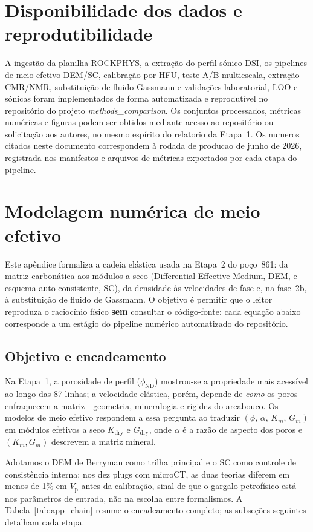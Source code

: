 \documentclass[11pt,a4paper]{article}
\numberwithin{equation}{section}
\newcommand{\phiND}{\ensuremath{\phi_{\mathrm{ND}}}}
\newcommand{\Vp}{\ensuremath{V_{\mathrm{p}}}}
\begin{document}
\section*{Disponibilidade dos dados e reprodutibilidade}

A ingestão da planilha ROCKPHYS, a extração do perfil sónico DSI, os
pipelines de meio efetivo DEM/SC, calibração por HFU, teste A/B multiescala,
extração CMR/NMR, substituição de fluido Gassmann e validações laboratorial,
LOO e sónicas foram
implementados de forma automatizada e reprodutível no repositório do projeto
\emph{methods\_comparison}.
Os conjuntos processados, métricas numéricas e figuras podem ser obtidos
mediante acesso ao repositório ou solicitação aos autores, no mesmo
espírito do relatorio da Etapa~1.
Os numeros citados neste documento correspondem à rodada de producao de
junho de 2026, registrada nos manifestos e arquivos de métricas exportados
por cada etapa do pipeline.

\appendix

\section{Modelagem numérica de meio efetivo}
\label{app:dem_core}

Este apêndice formaliza a cadeia elástica usada na Etapa~2 do poço~861:
da matriz carbonática aos módulos a seco (Differential Effective Medium, DEM,
e esquema auto-consistente, SC), da densidade às velocidades de fase e,
na fase~2b, à substituição de fluido de Gassmann.
O objetivo é permitir que o leitor reproduza o raciocínio físico \textbf{sem}
consultar o código-fonte: cada equação abaixo corresponde a um estágio do
pipeline numérico automatizado do repositório.

\subsection{Objetivo e encadeamento}

Na Etapa~1, a porosidade de perfil (\phiND{}) mostrou-se a propriedade mais
acessível ao longo das 87 linhas; a velocidade elástica, porém, depende de
\emph{como} os poros enfraquecem a matriz---geometria, mineralogia e rigidez
do arcabouco.
Os modelos de meio efetivo respondem a essa pergunta ao traduzir
$(\phi,\,\alpha,\,K_m,\,G_m)$ em módulos efetivos a seco
$K_{\mathrm{dry}}$ e $G_{\mathrm{dry}}$, onde $\alpha$ é a razão de aspecto
dos poros e $(K_m,G_m)$ descrevem a matriz mineral.

Adotamos o DEM de Berryman como trilha principal e o SC como controle de
consistência interna: nos dez plugs com microCT, as duas teorias diferem em
menos de 1\% em \Vp{} antes da calibração, sinal de que o gargalo petrofísico
está nos parâmetros de entrada, não na escolha entre formalismos.
A Tabela~\ref{tab:app_chain} resume o encadeamento completo; as subseções
seguintes detalham cada etapa.
\end{document}
